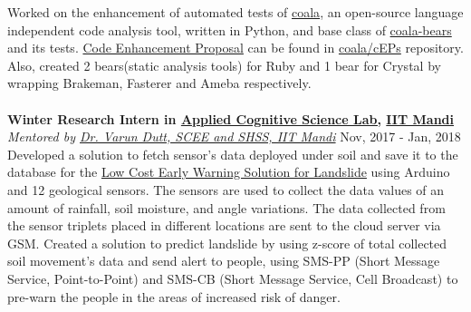 \documentclass[margin, centered]{res}
\begin{document}
\begin{resume}
    Worked on the enhancement of automated tests of \href{https://github.com/coala/coala}{coala},
    an open-source language independent code analysis tool, written in Python, and base
    class of \href{https://github.com/coala/coala-bears}{coala-bears} and its tests.
    \href{https://github.com/coala/cEPs/blob/master/cEP-0027.md}{Code Enhancement Proposal} can be found
    in \href{https://github.com/coala/cEPs}{coala/cEPs} repository. Also, created 2 bears(static analysis tools)
    for Ruby and 1 bear for Crystal by wrapping Brakeman, Fasterer and Ameba respectively. \\
    \\
    \textbf{Winter Research Intern in \href{http://acslab.org}{Applied Cognitive Science Lab,} \href{https://iitmandi.ac.in/}{IIT Mandi}} \\
    \emph{Mentored by \href{https://faculty.iitmandi.ac.in/~varun/}{Dr. Varun Dutt, SCEE and SHSS, IIT Mandi}} \hfill Nov, 2017 - Jan, 2018 \\
    Developed a solution to fetch sensor’s data deployed under soil and save it to the database for the
    \href{http://landslidemonitoring.esy.es/}{Low Cost Early Warning Solution for Landslide} using Arduino
    and 12 geological sensors. The sensors are used to collect the data values of an amount of rainfall,
    soil moisture, and angle variations. The data collected from the sensor triplets placed in different
    locations are sent to the cloud server via GSM. Created a solution to predict landslide by using z-score
    of total collected soil movement’s data and send alert to people, using SMS-PP (Short Message Service,
    Point-to-Point) and SMS-CB (Short Message Service, Cell Broadcast) to pre-warn the people in the areas
    of increased risk of danger.



\end{resume}
\end{document}
